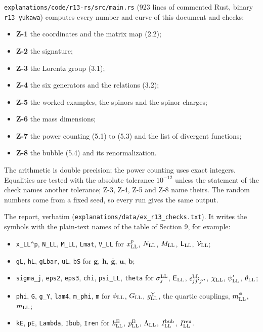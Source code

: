 \documentclass[
  10pt,
]{article}
\providecommand{\tightlist}{%
  \setlength{\itemsep}{0pt}\setlength{\parskip}{0pt}}
\begin{document}
\texttt{explanations/code/r13-rs/src/main.rs} (923 lines of commented
Rust, binary \texttt{r13\_yukawa}) computes every number and curve of
this document and checks:

\begin{itemize}
\tightlist
\item
  \textbf{Z-1} the coordinates and the matrix map (2.2);
\item
  \textbf{Z-2} the signature;
\item
  \textbf{Z-3} the Lorentz group (3.1);
\item
  \textbf{Z-4} the six generators and the relations (3.2);
\item
  \textbf{Z-5} the worked examples, the spinors and the spinor charges;
\item
  \textbf{Z-6} the mass dimensions;
\item
  \textbf{Z-7} the power counting (5.1) to (5.3) and the list of
  divergent functions;
\item
  \textbf{Z-8} the bubble (5.4) and its renormalization.
\end{itemize}

The arithmetic is double precision; the power counting uses exact
integers. Equalities are tested with the absolute tolerance \(10^{-12}\)
unless the statement of the check names another tolerance; Z-3, Z-4, Z-5
and Z-8 name theirs. The random numbers come from a fixed seed, so every
run gives the same output.

The report, verbatim (\texttt{explanations/data/ex\_r13\_checks.txt}).
It writes the symbols with the plain-text names of the table of Section
9, for example:

\begin{itemize}
\tightlist
\item
  \texttt{x\_LL\^{}p}, \texttt{N\_LL}, \texttt{M\_LL}, \texttt{Lmat},
  \texttt{V\_LL} for \(x^p_{\rm LL}\), \(N_{\rm LL}\), \(M_{\rm LL}\),
  \(\mathsf L_{\rm LL}\), \(\mathcal V_{\rm LL}\);
\item
  \texttt{gL}, \texttt{hL}, \texttt{gLbar}, \texttt{uL}, \texttt{bS} for
  \(\mathbf g\), \(\mathbf h\), \(\bar{\mathbf g}\), \(\mathbf u\),
  \(\mathbf b\);
\item
  \texttt{sigma\_j}, \texttt{eps2}, \texttt{eps3}, \texttt{chi},
  \texttt{psi\textquotesingle{}\_LL}, \texttt{theta} for
  \(\sigma^{\rm LL}_j\), \(\mathsf E_{\rm LL}\),
  \(\epsilon^{\rm LL}_{jj'j''}\), \(\chi_{\rm LL}\), \(\psi'_{\rm LL}\),
  \(\theta_{\rm LL}\);
\item
  \texttt{phi}, \texttt{G}, \texttt{g\_Y}, \texttt{lam4},
  \texttt{m\_phi}, \texttt{m} for \(\phi_{\rm LL}\), \(G_{\rm LL}\),
  \(g^{\rm Y}_{\rm LL}\), the quartic couplings, \(m^\phi_{\rm LL}\),
  \(m_{\rm LL}\);
\item
  \texttt{kE}, \texttt{pE}, \texttt{Lambda}, \texttt{Ibub},
  \texttt{Iren} for \(k^{\rm E}_{\rm LL}\), \(p^{\rm E}_{\rm LL}\),
  \(\Lambda_{\rm LL}\), \(I^{\rm bub}_{\rm LL}\),
  \(I^{\rm ren}_{\rm LL}\).
\end{itemize}
\end{document}
